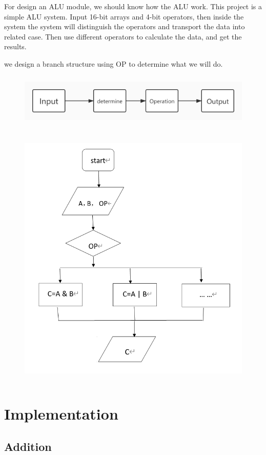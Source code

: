 \documentclass[12pt,a4paper]{article}
\begin{document}
For design an ALU module, we should know how the ALU work.
This project is a simple ALU system.
Input 16-bit arrays and 4-bit operators, then inside the system the system will distinguish the operators and transport the data into related case.
Then use different operators to calculate the data, and get the results.

we design a branch structure using OP to determine what we will do.
\begin{figure}[H]
  \centering
  \includegraphics[height=1in]{1.jpg}
  \end{figure}

\begin{figure}[H]
  \centering
  \includegraphics[height=5in]{TIM.png}
  \end{figure}

\newpage

\section{Implementation}
\subsection{Addition}
\end{document}
